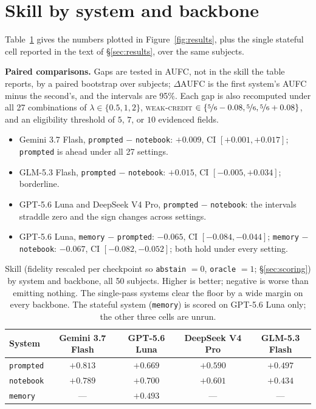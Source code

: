 \documentclass{article}
\begin{document}
\section{Skill by system and backbone}
\label{app:resultstable}

Table~\ref{tab:results} gives the numbers plotted in Figure~\ref{fig:results}, plus the single
stateful cell reported in the text of \S\ref{sec:results}, over the same subjects.

\textbf{Paired comparisons.} Gaps are tested in AUFC, not in the skill the table reports, by a
paired bootstrap over subjects; $\Delta\mathrm{AUFC}$ is the first system's AUFC minus the
second's, and the intervals are 95\%. Each gap is also recomputed under all 27 combinations of
$\lambda\in\{0.5,1,2\}$, \textsc{weak-credit} $\in\{\nicefrac{5}{6}-0.08,\nicefrac{5}{6},\nicefrac{5}{6}+0.08\}$,
and an eligibility threshold of $5$, $7$, or $10$ evidenced fields.
\begin{itemize}
  \item Gemini 3.7 Flash, \texttt{prompted} $-$ \texttt{notebook}: $+0.009$, CI $[+0.001, +0.017]$;
  \texttt{prompted} is ahead under all 27 settings.
  \item GLM-5.3 Flash, \texttt{prompted} $-$ \texttt{notebook}: $+0.015$, CI $[-0.005, +0.034]$;
  borderline.
  \item GPT-5.6 Luna and DeepSeek V4 Pro, \texttt{prompted} $-$ \texttt{notebook}: the intervals
  straddle zero and the sign changes across settings.
  \item GPT-5.6 Luna, \texttt{memory} $-$ \texttt{prompted}: $-0.065$, CI $[-0.084, -0.044]$;
  \texttt{memory} $-$ \texttt{notebook}: $-0.067$, CI $[-0.082, -0.052]$; both hold under every
  setting.
\end{itemize}

\begin{table}[h]
  \centering
  \caption{Skill (fidelity rescaled per checkpoint so \texttt{abstain} $=0$, \texttt{oracle} $=1$; \S\ref{sec:scoring}) by system and
  backbone, all 50 subjects. Higher is better; negative is
  worse than emitting nothing. The single-pass systems clear the floor by a wide margin on every
  backbone. The stateful system (\texttt{memory}) is scored on GPT-5.6 Luna only; the other three
  cells are unrun.}
  \label{tab:results}
  \begin{tabular}{@{}lcccc@{}}
    \toprule
    System & Gemini 3.7 Flash & GPT-5.6 Luna & DeepSeek V4 Pro & GLM-5.3 Flash \\
    \midrule
    \texttt{prompted}          & $+0.813$ & $+0.669$ & $+0.590$ & $+0.497$ \\
    \texttt{notebook}          & $+0.789$ & $+0.700$ & $+0.601$ & $+0.434$ \\
    \texttt{memory}            & ---      & $+0.493$ & ---      & ---      \\
    \bottomrule
  \end{tabular}
\end{table}
\end{document}
